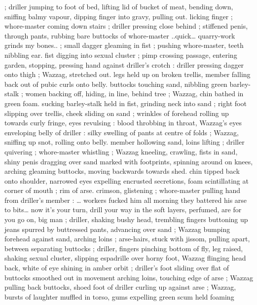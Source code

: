 ; driller jumping to foot of bed, lifting lid of bucket of meat, bending 
down, sniffing balmy vapour, dipping finger into gravy, pulling out. 
licking finger ; whore-master coming down stairs ; driller pressing 
close behind ; stiffened penis, through pants, rubbing bare buttocks 
of whore-master{\td} {\gl}..quick{\ldots} quarry-work grinds my bones..{\gr} ; small 
dagger gleaming in fist ; pushing whore-master, teeth nibbling ear. 
fist digging into sexual cluster ; pimp crossing passage, entering 
garden, stopping, pressing hand against driller's crotch : driller 
pressing dagger onto thigh ; Wazzag, stretched out. legs held up on 
broken trellis, member falling back out of pubic curls onto belly. 
buttocks touching sand, nibbling green barley-stalk ; women backing 
off, hiding, in line, behind tree ; Wazzag, chin bathed in green foam. 
sucking barley-stalk held in fist, grinding neck into sand ; right foot 
slipping over trellis, cheek sliding on sand ; wrinkles of forehead 
rolling up towards curly fringe, eyes revulsing : blood throbbing in 
throat, Wazzag's eyes enveloping belly of driller : silky swelling of 
pants at centre of folds ; Wazzag, sniffing up snot, rolling onto belly. 
member hollowing sand, loins lifting ; driller quivering ; whore-master 
whistling ; Wazzag kneeling, crawling, fists in sand, shiny penis 
dragging over sand marked with footprints, spinning around on 
knees, arching gleaming buttocks, moving backwards towards shed. 
chin tipped back onto shoulder, narrowed eyes expelling encrusted 
secretions, foam scintillating at corner of mouth ; rim of arse. 
crimson, glistening ; whore-master pulling hand from driller's 
member : {\td} {\gl} {\ldots} workers fucked him all morning{\td} they battered his 
arse to bits{\ldots} now it's your turn, drill your way in{\td} the soft layers, 
perfumed, are for you{\td} go on, big man {\gr} ; driller, shaking bushy head, 
trembling fingers buttoning up jeans spurred by buttressed pants, 
advancing over sand ; Wazzag bumping forehead against sand, 
arching loins ; arse-hairs, stuck with jissom, pulling apart, between 
separating buttocks ; driller, fingers pinching bottom of fly, leg 
raised, shaking sexual cluster, slipping espadrille over horny foot, 
Wazzag flinging head back, white of eye shining in amber orbit ; 
driller's foot sliding over flat of buttocks smoothed out in movement 
arching loins, touching edge of arse ; Wazzag pulling back buttocks, 
shoed foot of driller curling up against arse ; Wazzag, bursts of 
laughter muffled in torso, gums expelling green scum held foaming 
